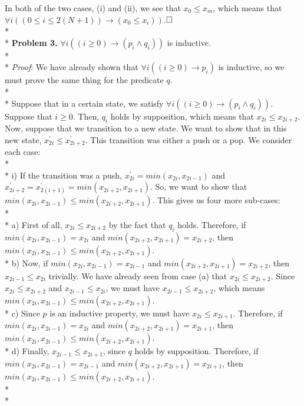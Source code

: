 \documentclass[12pt]{article}
\begin{document}
In both of the two cases, (i) and (ii), we see that $x_0\leq x_m$, which means that $\forall i((0\leq i\leq2(N+1))\rightarrow(x_0\leq x_i))$.$\hfill\Box$\\*\\*
\textbf{Problem 3.} $\forall i((i\geq0)\rightarrow(p_i\wedge q_i))$ is inductive.\\*\\*
\textit{Proof}: We have already shown that $\forall i((i\geq0)\rightarrow p_i)$ is inductive, so we must prove the same thing for the predicate $q$.\\*\\*
Suppose that in a certain state, we satisfy $\forall i((i\geq0)\rightarrow(p_i\wedge q_i))$. Suppose that $i\geq0$. Then, $q_i$ holds by supposition, which means that $x_{2i}\leq x_{2i+2}$. Now, suppose that we transition to a new state. We want to show that in this new state, $x^\prime_{2i}\leq x^\prime_{2i+2}$. This transition was either a push or a pop. We consider each case:\\*\\*
i) If the transition was a push, $x^\prime_{2i}=min(x_{2i},x_{2i-1})$ and $x^\prime_{2i+2}=x^\prime_{2(i+1)}=min(x_{2i+2},x_{2i+1})$. So, we want to show that $min(x_{2i},x_{2i-1})\leq min(x_{2i+2},x_{2i+1})$. This gives us four more sub-cases:\\*\\*
a) First of all, $x_{2i}\leq x_{2i+2}$ by the fact that $q_i$ holds. Therefore, if $min(x_{2i},x_{2i-1})=x_{2i}$ and $min(x_{2i+2},x_{2i+1})=x_{2i+2}$, then $min(x_{2i},x_{2i-1})\leq min(x_{2i+2},x_{2i+1})$.\\*
b) Now, if $min(x_{2i},x_{2i-1})=x_{2i-1}$ and $min(x_{2i+2},x_{2i+1})=x_{2i+2}$, then $x_{2i-1}\leq x_{2i}$ trivially. We have already seen from case (a) that $x_{2i}\leq x_{2i+2}$. Since $x_{2i}\leq x_{2i+2}$ and $x_{2i-1}\leq x_{2i}$, we must have $x_{2i-1}\leq x_{2i+2}$, which means $min(x_{2i},x_{2i-1})\leq min(x_{2i+2},x_{2i+1})$.\\*
c) Since $p$ is an inductive property, we must have $x_{2i}\leq x_{2i+1}$. Therefore, if $min(x_{2i},x_{2i-1})=x_{2i}$ and $min(x_{2i+2},x_{2i+1})=x_{2i+1}$, then $min(x_{2i},x_{2i-1})\leq min(x_{2i+2},x_{2i+1})$.\\*
d) Finally, $x_{2i-1}\leq x_{2i+1}$, since $q$ holds by supposition. Therefore, if $min(x_{2i},x_{2i-1})=x_{2i-1}$ and $min(x_{2i+2},x_{2i+1})=x_{2i+1}$, then $min(x_{2i},x_{2i-1})\leq min(x_{2i+2},x_{2i+1})$.\\*\\*
\end{document}
